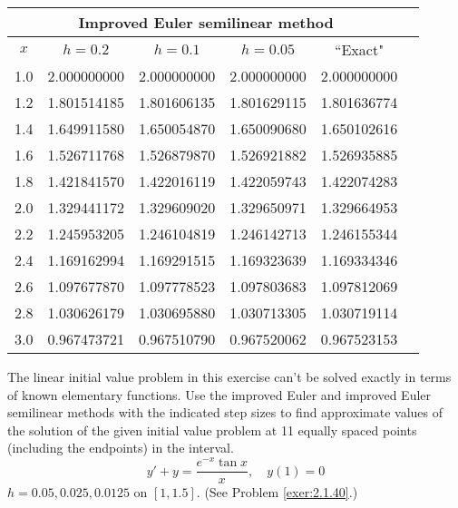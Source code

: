 \documentclass{ximera}
\begin{document}
\begin{problem}
\begin{solution}
{\small
\begin{tabular}{|c|r|r|r|r|r|}
\hline
\multicolumn{5}{|c|}{Improved Euler semilinear method}\\
\hline
\multicolumn{1}{|c|}{$x$}&
\multicolumn{1}{|c|}{$h=0.2$}&
\multicolumn{1}{|c|}{$h=0.1$}&
\multicolumn{1}{|c|}{$h=0.05$}&
\multicolumn{1}{|c|}{``Exact"}\\ \hline
1.0 & 2.000000000 & 2.000000000 & 2.000000000 & 2.000000000 \\
1.2 & 1.801514185 & 1.801606135 & 1.801629115 & 1.801636774 \\
1.4 & 1.649911580 & 1.650054870 & 1.650090680 & 1.650102616 \\
1.6 & 1.526711768 & 1.526879870 & 1.526921882 & 1.526935885 \\
1.8 & 1.421841570 & 1.422016119 & 1.422059743 & 1.422074283 \\
2.0 & 1.329441172 & 1.329609020 & 1.329650971 & 1.329664953 \\
2.2 & 1.245953205 & 1.246104819 & 1.246142713 & 1.246155344 \\
2.4 & 1.169162994 & 1.169291515 & 1.169323639 & 1.169334346 \\
2.6 & 1.097677870 & 1.097778523 & 1.097803683 & 1.097812069 \\
2.8 & 1.030626179 & 1.030695880 & 1.030713305 & 1.030719114 \\
3.0 & 0.967473721 & 0.967510790 & 0.967520062 & 0.967523153 \\
\hline
\end{tabular}}
\end{solution}
\end{problem}

\begin{problem}\label{exer:3.2.17} The linear initial value problem in this exercise can't be solved exactly in terms of known elementary functions. Use the improved Euler and improved Euler semilinear methods with the indicated step sizes to find approximate values of the solution of the given initial value problem at 11 equally spaced points (including the endpoints) in the interval.
$$y'+y=\frac{e^{-x}\tan x}{x},\quad y(1)=0$$
$h=0.05,0.025,0.0125$ on $[1,1.5]$.
(See Problem \ref{exer:2.1.40}.)
\end{problem}
\end{document}
